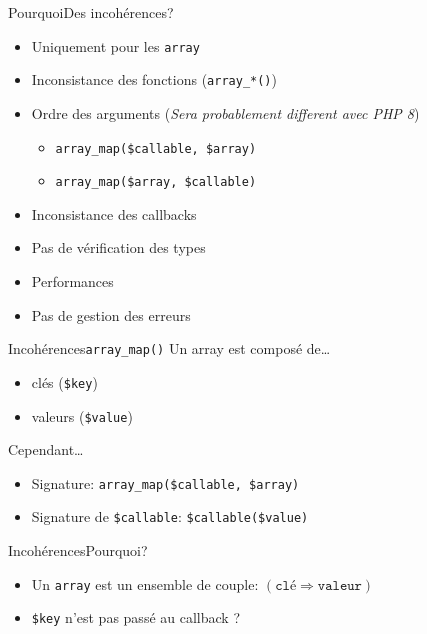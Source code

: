 \begin{frame}{Pourquoi}{Des incohérences?}
    \begin{itemize}[<+->]
        \item Uniquement pour les \texttt{array}
        \item Inconsistance des fonctions (\texttt{array\_*()})
        \item Ordre des arguments (\textit{Sera probablement different avec PHP 8})
        \begin{itemize}[<+->]
            \item \texttt{array\_map(\$callable, \$array)}
            \item \texttt{array\_map(\$array, \$callable)}
        \end{itemize}
        \item Inconsistance des callbacks
        \item Pas de vérification des types
        \item Performances
        \item Pas de gestion des erreurs
    \end{itemize}
\end{frame}

\begin{frame}{Incohérences}{\texttt{array\_map()}}
    Un array est composé de\ldots

    \begin{itemize}[<+->]
        \item clés (\texttt{\$key})
        \item valeurs (\texttt{\$value})
    \end{itemize}

    \pause[\thebeamerpauses]

    Cependant\ldots

    \pause[\thebeamerpauses]

    \begin{itemize}[<+->]
        \item Signature: \texttt{array\_map(\$callable, \$array)}
        \item Signature de \texttt{\$callable}: \texttt{\$callable(\$value)}
    \end{itemize}
\end{frame}

\begin{frame}{Incohérences}{Pourquoi?}
    \begin{itemize}[<+->]
        \item Un \texttt{array} est un ensemble de couple: $\left(\texttt{clé} \Rightarrow \texttt{valeur}\right)$
        \item \texttt{\$key} n'est pas passé au callback ?
    \end{itemize}
\end{frame}


